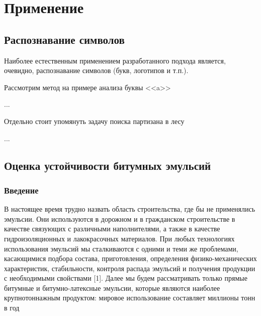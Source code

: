 \chapter{Применение} \label{chapt3}
\section{Распознавание символов}
Наиболее естественным применением разработанного подхода является, очевидно, распознавание символов (букв, логотипов и т.п.).

Рассмотрим метод на примере анализа буквы <<a>>

...

Отдельно стоит упомянуть задачу поиска партизана в лесу

...
\section{Оценка устойчивости битумных эмульсий}
\subsection{Введение}
В настоящее время трудно назвать область строительства, где бы не применялись эмульсии. Они используются в дорожном и в гражданском строительстве в качестве связующих с различными наполнителями, а также в качестве гидроизоляционных и лакокрасочных материалов. При любых технологиях использования эмульсий мы сталкиваются с одними и теми же проблемами, касающимися подбора состава, приготовления, определения физико-механических характеристик, стабильности, контроля распада эмульсий и получения продукции с необходимыми свойствами [1]. Далее мы будем рассматривать только прямые битумные и битумно-латексные эмульсии, которые являются наиболее крупнотоннажным продуктом: мировое использование составляет миллионы тонн в год


